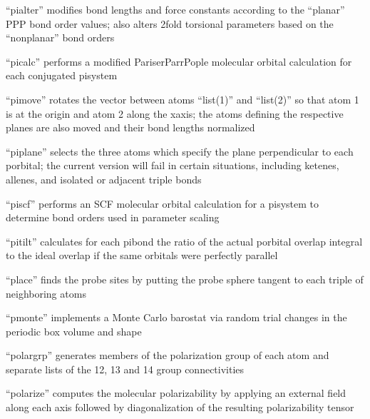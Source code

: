 \documentclass[letterpaper,11pt,english]{sphinxmanual}
\begin{document}
“pialter” modifies bond lengths and force constants according
to the “planar” P\sphinxhyphen{}P\sphinxhyphen{}P bond order values; also alters 2\sphinxhyphen{}fold
torsional parameters based on the “nonplanar” bond orders


“picalc” performs a modified Pariser\sphinxhyphen{}Parr\sphinxhyphen{}Pople molecular
orbital calculation for each conjugated pisystem


“pimove” rotates the vector between atoms “list(1)” and
“list(2)” so that atom 1 is at the origin and atom 2 along
the x\sphinxhyphen{}axis; the atoms defining the respective planes are
also moved and their bond lengths normalized


“piplane” selects the three atoms which specify the plane
perpendicular to each p\sphinxhyphen{}orbital; the current version will
fail in certain situations, including ketenes, allenes,
and isolated or adjacent triple bonds


“piscf” performs an SCF molecular orbital calculation for a
pisystem to determine bond orders used in parameter scaling


“pitilt” calculates for each pibond the ratio of the
actual p\sphinxhyphen{}orbital overlap integral to the ideal overlap
if the same orbitals were perfectly parallel


“place” finds the probe sites by putting the probe sphere
tangent to each triple of neighboring atoms


“pmonte” implements a Monte Carlo barostat via random trial
changes in the periodic box volume and shape


“polargrp” generates members of the polarization group of
each atom and separate lists of the 1\sphinxhyphen{}2, 1\sphinxhyphen{}3 and 1\sphinxhyphen{}4 group
connectivities


“polarize” computes the molecular polarizability by applying
an external field along each axis followed by diagonalization
of the resulting polarizability tensor
\end{document}
